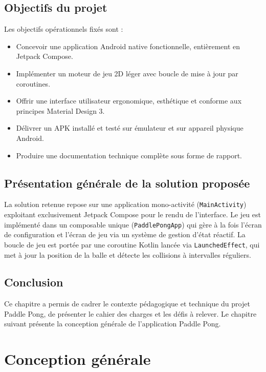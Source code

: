 \documentclass[12pt,a4paper]{report}
\begin{document}
\section{Objectifs du projet}
Les objectifs op\'erationnels fix\'es sont :
\begin{itemize}
    \item Concevoir une application Android native fonctionnelle, enti\`erement en Jetpack Compose.
    \item Impl\'ementer un moteur de jeu 2D l\'eger avec boucle de mise \`a jour par coroutines.
    \item Offrir une interface utilisateur ergonomique, esth\'etique et conforme aux principes Material Design 3.
    \item D\'elivrer un APK install\'e et test\'e sur \'emulateur et sur appareil physique Android.
    \item Produire une documentation technique compl\`ete sous forme de rapport.
\end{itemize}

\section{Pr\'esentation g\'en\'erale de la solution propos\'ee}
La solution retenue repose sur une application mono-activit\'e (\texttt{MainActivity}) exploitant exclusivement Jetpack Compose pour le rendu de l'interface. Le jeu est impl\'ement\'e dans un composable unique (\texttt{PaddlePongApp}) qui g\`ere \`a la fois l'\'ecran de configuration et l'\'ecran de jeu via un syst\`eme de gestion d'\'etat r\'eactif. La boucle de jeu est port\'ee par une coroutine Kotlin lanc\'ee via \texttt{LaunchedEffect}, qui met \`a jour la position de la balle et d\'etecte les collisions \`a intervalles r\'eguliers.

\section*{Conclusion}
Ce chapitre a permis de cadrer le contexte p\'edagogique et technique du projet Paddle Pong, de pr\'esenter le cahier des charges et les d\'efis \`a relever. Le chapitre suivant pr\'esente la conception g\'en\'erale de l'application Paddle Pong.

\newpage

\chapter{Conception g\'en\'erale}
\end{document}
